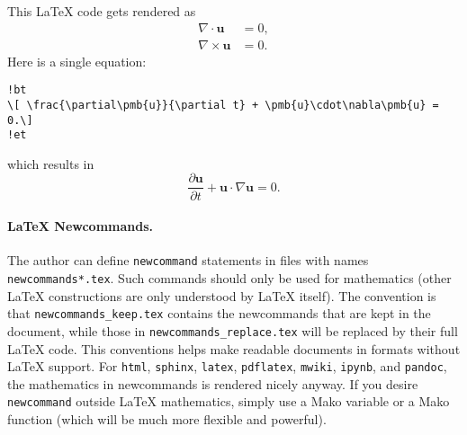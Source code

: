\documentclass[%
oneside,                 %
final,                   %
10pt]{article}
\begin{document}
This {\LaTeX} code gets rendered as
\begin{align*}
\nabla\cdot \pmb{u} &= 0,\\ 
\nabla\times \pmb{u} &= 0.
\end{align*}
Here is a single equation:
\begin{Verbatim}[numbers=none,fontsize=\fontsize{9pt}{9pt},baselinestretch=0.95,xleftmargin=2mm]
!bt
\[ \frac{\partial\pmb{u}}{\partial t} + \pmb{u}\cdot\nabla\pmb{u} = 0.\]
!et

\end{Verbatim}

which results in
\[ \frac{\partial\pmb{u}}{\partial t} + \pmb{u}\cdot\nabla\pmb{u} = 0.\]
\paragraph{LaTeX Newcommands.}
The author can define \texttt{newcommand} statements in files with names
\texttt{newcommands*.tex}. Such commands should only be used for mathematics
(other {\LaTeX} constructions are only understood by {\LaTeX} itself).
The convention is that \Verb!newcommands_keep.tex!
contains the newcommands that are kept in the document, while
those in \Verb!newcommands_replace.tex! will be replaced by their full
{\LaTeX} code. This conventions helps make readable documents in formats
without {\LaTeX} support. For \texttt{html}, \texttt{sphinx}, \texttt{latex}, \texttt{pdflatex},
\texttt{mwiki}, \texttt{ipynb}, and \texttt{pandoc}, the mathematics in newcommands is
rendered nicely anyway. If you desire \texttt{newcommand} outside {\LaTeX}
mathematics, simply use a Mako variable or a Mako function (which
will be much more flexible and powerful).
\end{document}
